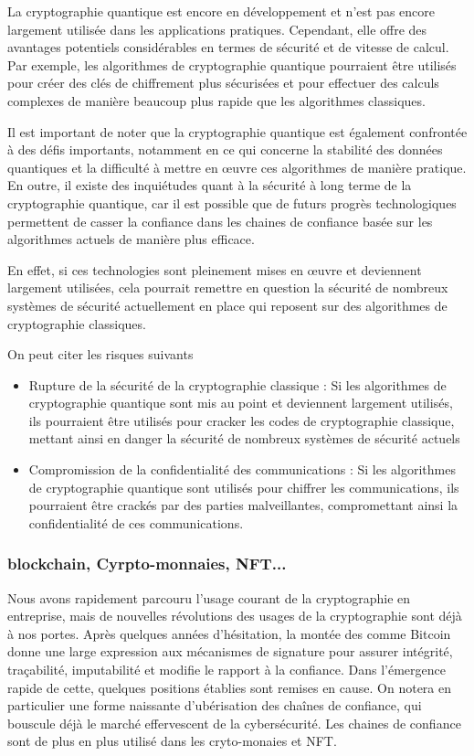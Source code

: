 La cryptographie quantique est encore en développement et n'est pas encore largement utilisée dans les applications pratiques. Cependant, elle offre des avantages potentiels considérables en termes de sécurité et de vitesse de calcul. Par exemple, les algorithmes de cryptographie quantique pourraient être utilisés pour créer des clés de chiffrement plus sécurisées et pour effectuer des calculs complexes de manière beaucoup plus rapide que les algorithmes classiques.

Il est important de noter que la cryptographie quantique est également confrontée à des défis importants, notamment en ce qui concerne la stabilité des données quantiques et la difficulté à mettre en œuvre ces algorithmes de manière pratique. En outre, il existe des inquiétudes quant à la sécurité à long terme de la cryptographie quantique, car il est possible que de futurs progrès technologiques permettent de casser la confiance dans les chaines de confiance basée sur les algorithmes actuels de manière plus efficace.

En effet, si ces technologies sont pleinement mises en œuvre et deviennent largement utilisées, cela pourrait remettre en question la sécurité de nombreux systèmes de sécurité actuellement en place qui reposent sur des algorithmes de cryptographie classiques.

On peut citer les risques suivants

\begin{itemize}
  \item Rupture de la sécurité de la cryptographie classique : Si les algorithmes de cryptographie quantique sont mis au point et deviennent largement utilisés, ils pourraient être utilisés pour cracker les codes de cryptographie classique, mettant ainsi en danger la sécurité de nombreux systèmes de sécurité actuels
  \item Compromission de la confidentialité des communications : Si les algorithmes de cryptographie quantique sont utilisés pour chiffrer les communications, ils pourraient être crackés par des parties malveillantes, compromettant ainsi la confidentialité de ces communications.
\end{itemize}


\subsubsection{blockchain, Cyrpto-monnaies, NFT...}
Nous avons rapidement parcouru l'usage courant de la cryptographie en entreprise, mais de nouvelles révolutions des usages de la cryptographie sont déjà à nos portes. Après quelques années d'hésitation, la montée des comme Bitcoin donne une large expression aux mécanismes de signature pour assurer intégrité, traçabilité, imputabilité et modifie le rapport à la confiance. Dans l'émergence rapide de cette, quelques positions établies sont remises en cause. On notera en particulier une forme naissante d'ubérisation des chaînes de confiance, qui bouscule déjà le marché effervescent de la cybersécurité. Les chaines de confiance sont de plus en plus utilisé dans les cryto-monaies et NFT.


